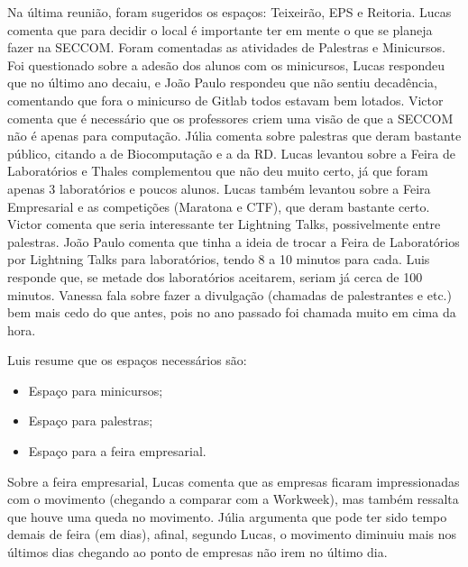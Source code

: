 \documentclass{ata-seccom}
\begin{document}

Na última reunião, foram sugeridos os espaços: Teixeirão, EPS e Reitoria. Lucas
comenta que para decidir o local é importante ter em mente o que se planeja
fazer na SECCOM\@. Foram comentadas as atividades de Palestras e Minicursos.
Foi questionado sobre a adesão dos alunos com os minicursos, Lucas respondeu
que no último ano decaiu, e João Paulo respondeu que não sentiu decadência,
comentando que fora o minicurso de Gitlab todos estavam bem lotados. Victor
comenta que é necessário que os professores criem uma visão de que a SECCOM não
é apenas para computação. Júlia comenta sobre palestras que deram bastante
público, citando a de Biocomputação e a da RD\@. Lucas levantou sobre a Feira
de Laboratórios e Thales complementou que não deu muito certo, já que foram
apenas 3 laboratórios e poucos alunos. Lucas também levantou sobre a Feira
Empresarial e as competições (Maratona e CTF), que deram bastante certo. Victor
comenta que seria interessante ter Lightning Talks, possivelmente entre
palestras. João Paulo comenta que tinha a ideia de trocar a Feira de
Laboratórios por Lightning Talks para laboratórios, tendo 8 a 10 minutos para
cada. Luis responde que, se metade dos laboratórios aceitarem, seriam já cerca
de 100 minutos. Vanessa fala sobre fazer a divulgação (chamadas de palestrantes
e etc.) bem mais cedo do que antes, pois no ano passado foi chamada muito em
cima da hora.

Luis resume que os espaços necessários são:

\begin{itemize}
    \item Espaço para minicursos;
    \item Espaço para palestras;
    \item Espaço para a feira empresarial.
\end{itemize}

Sobre a feira empresarial, Lucas comenta que as empresas ficaram impressionadas
com o movimento (chegando a comparar com a Workweek), mas também ressalta que
houve uma queda no movimento. Júlia argumenta que pode ter sido tempo demais de
feira (em dias), afinal, segundo Lucas, o movimento diminuiu mais nos últimos
dias chegando ao ponto de empresas não irem no último dia.
\end{document}
